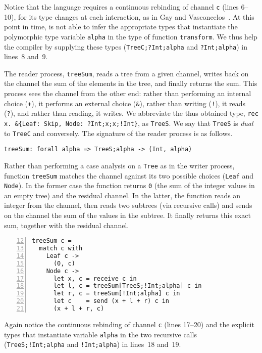 Notice that the language requires a continuous rebinding of channel
\lstinline|c| (lines 6--10), for its type changes at each interaction,
as in Gay and Vasconcelos~\cite{DBLP:journals/jfp/GayV10}.
%
At this point in time, \freest{} is not able to infer the appropriate
types that instantiate the polymorphic type variable \lstinline|alpha|
in the type of function \lstinline|transform|. We thus help the
compiler by supplying these types (\lstinline|TreeC;?Int;alpha| and
\lstinline|?Int;alpha|) in lines~8 and~9.

The reader process, \lstinline|treeSum|, reads a tree from a given
channel, writes back on the channel the sum of the elements in the
tree, and finally returns the sum. This process sees the channel from
the other end: rather than performing an internal choice
(\lstinline|+|), it performs an external choice (\lstinline|&|),
rather than writing (\lstinline|!|), it reads (\lstinline|?|), and
rather than reading, it writes. We abbreviate the thus obtained type,
\lstinline|rec x. &{Leaf: Skip, Node: ?Int;x;x;!Int}|, as
\lstinline|TreeS|. We say that \lstinline|TreeS| is \emph{dual} to
\lstinline|TreeC| and conversely. The signature of the reader process
is as follows.
%
\begin{lstlisting}
treeSum: forall alpha => TreeS;alpha -> (Int, alpha)
\end{lstlisting}

Rather than performing a case analysis on a \lstinline|Tree| as in the
writer process, function \lstinline|treeSum| matches the channel
against its two possible choices (\lstinline|Leaf| and
\lstinline|Node|). In the former case the function returns
\lstinline|0| (the sum of the integer values in an empty tree) and the
residual channel. In the latter, the function reads an integer from
the channel, then reads two subtrees (via recursive calls) and sends
on the channel the sum of the values in the subtree. It finally
returns this exact sum, together with the residual channel.
%
\label{lst:treeSum}
\begin{lstlisting}[numbers=left,firstnumber=12]
treeSum c =
  match c with
    Leaf c ->
      (0, c)
    Node c ->
      let x, c = receive c in
      let l, c = treeSum[TreeS;!Int;alpha] c in
      let r, c = treeSum[!Int;alpha] c in
      let c    = send (x + l + r) c in
      (x + l + r, c)
\end{lstlisting}

Again notice the continuous rebinding of channel \lstinline|c| (lines
17--20) and the explicit types that instantiate variable
\lstinline|alpha| in the two recursive calls
(\lstinline|TreeS;!Int;alpha| and \lstinline|!Int;alpha|) in lines~18
and~19.

